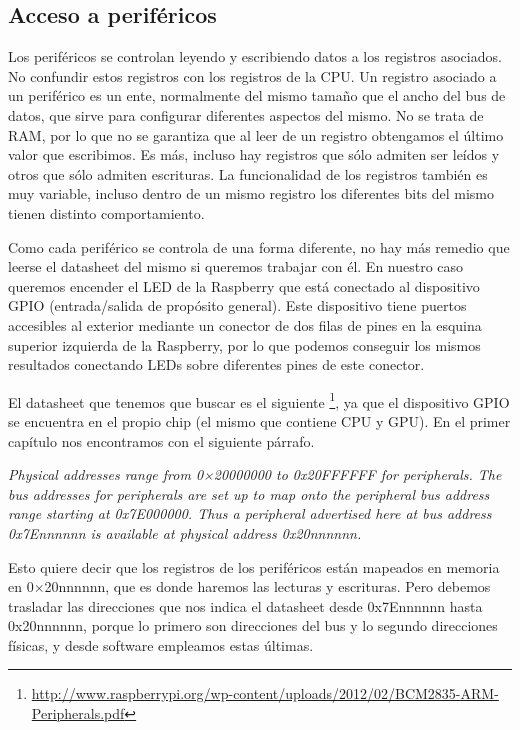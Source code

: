 \subsection{Acceso a periféricos}

Los periféricos se controlan leyendo y escribiendo datos a los registros asociados. No
confundir estos registros con los registros de la CPU. Un registro asociado a un periférico
es un ente, normalmente del mismo tamaño que el ancho del bus de datos, que sirve para
configurar diferentes aspectos del mismo. No se trata de RAM, por lo que no se garantiza que
al leer de un registro obtengamos el último valor que escribimos. Es más, incluso hay
registros que sólo admiten ser leídos y otros que sólo admiten escrituras. La funcionalidad
de los registros también es muy variable, incluso dentro de un mismo registro los diferentes
bits del mismo tienen distinto comportamiento.

Como cada periférico se controla de una forma diferente, no hay más remedio que leerse
el datasheet del mismo si queremos trabajar con él. En nuestro caso queremos encender el LED
de la Raspberry que está conectado al dispositivo GPIO (entrada/salida de propósito general).
Este dispositivo tiene puertos accesibles al exterior mediante un conector de dos filas de
pines en la esquina superior izquierda de la Raspberry, por lo que podemos conseguir los
mismos resultados conectando LEDs sobre diferentes pines de este conector.

El datasheet que tenemos que buscar es el siguiente
\footnote{\url{http://www.raspberrypi.org/wp-content/uploads/2012/02/BCM2835-ARM-Peripherals.pdf}},
ya que el dispositivo GPIO se encuentra en el propio chip (el mismo que contiene CPU y GPU).
En el primer capítulo nos encontramos con el siguiente párrafo.

{\it Physical addresses range from 0×20000000 to 0x20FFFFFF for peripherals. The bus addresses
for peripherals are set up to map onto the peripheral bus address range starting at
0x7E000000. Thus a peripheral advertised here at bus address 0x7Ennnnnn is available
at physical address 0x20nnnnnn.}

Esto quiere decir que los registros de los periféricos están mapeados en memoria en
0×20nnnnnn, que es donde haremos las lecturas y escrituras. Pero debemos
trasladar las direcciones que nos indica el datasheet desde 0x7Ennnnnn hasta 0x20nnnnnn,
porque lo primero son direcciones del bus y lo segundo direcciones físicas, y desde
software empleamos estas últimas.

